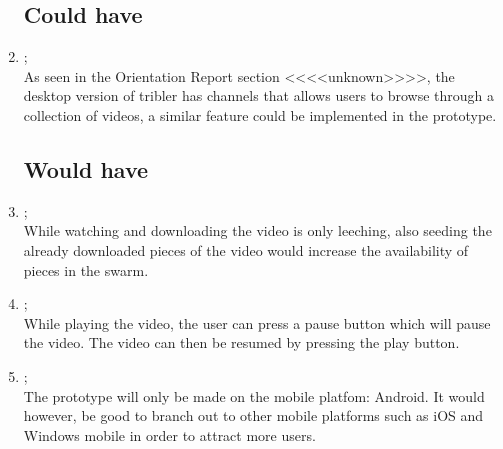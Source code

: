 \begin{enumerate}
\subsection{Could have}
\item {};\\
As seen in the Orientation Report section <<<<unknown>>>>, the desktop version of tribler has channels that allows users to browse through a collection of videos, a similar feature could be implemented in the prototype.

\subsection{Would have}
\item {};\\
While watching and downloading the video is only leeching, also seeding the already downloaded pieces of the video would increase the availability of pieces in the swarm.

\item {};\\
While playing the video, the user can press a pause button which will pause the video. The video can then be resumed by pressing the play button.

\item {};\\
The prototype will only be made on the mobile platfom: Android. It would however, be good to branch out to other mobile platforms such as iOS and Windows mobile in order to attract more users.

\end{enumerate}

